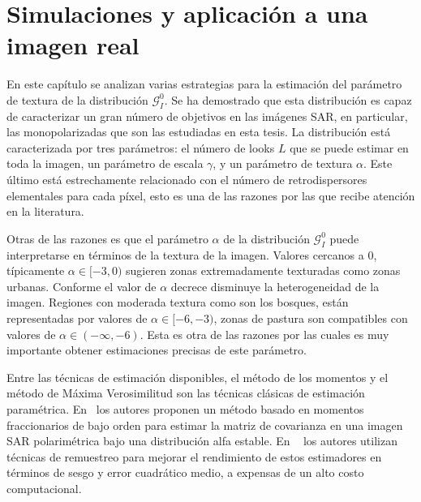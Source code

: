 
\chapter{Simulaciones y aplicación a una imagen real}
\label{ResultadosEmpiricos}


En este capítulo se analizan varias estrategias para la estimación del parámetro de textura de la distribución $\mathcal{G}_I^0$.
Se ha demostrado que esta distribución es capaz de caracterizar un gran número de objetivos en las imágenes SAR, en particular, las monopolarizadas que son las estudiadas en esta tesis. La distribución está caracterizada por tres parámetros: el número de looks $L$ que se puede estimar en toda la imagen, un parámetro de escala $\gamma$, y un parámetro de textura $\alpha$. Este último está estrechamente relacionado con el número
de retrodispersores elementales para cada píxel, esto es una de las razones por las que recibe atención en la literatura. 

Otras de las razones es que el parámetro $\alpha$ de la distribución $\mathcal{G}_I^0$ puede interpretarse en términos de la textura de la imagen. Valores cercanos a $0$, típicamente $\alpha \in [-3,0)$ sugieren zonas extremadamente texturadas como zonas urbanas. Conforme el valor de $\alpha$ decrece disminuye la heterogeneidad de la imagen. Regiones con moderada textura como son los bosques, están representadas por valores de $\alpha \in [-6,-3)$, zonas de pastura son compatibles con valores de $\alpha \in (-\infty,-6)$. Esta es otra de las razones por las cuales es muy importante obtener estimaciones precisas de este parámetro.

Entre las técnicas de estimación disponibles, el método de los momentos y el método de Máxima Verosimilitud son las técnicas clásicas de estimación paramétrica. En~\cite{Bian2013} los autores proponen un método basado en
momentos fraccionarios de bajo orden para estimar la matriz de covarianza en una imagen SAR polarimétrica bajo una distribución alfa estable. En ~\cite{VasconcellosFrerySilva:CompStat,CribariFrerySilva:CSDA} los autores utilizan técnicas de remuestreo para mejorar el rendimiento de estos estimadores en términos de sesgo y error cuadrático medio, a expensas de un alto costo computacional.


